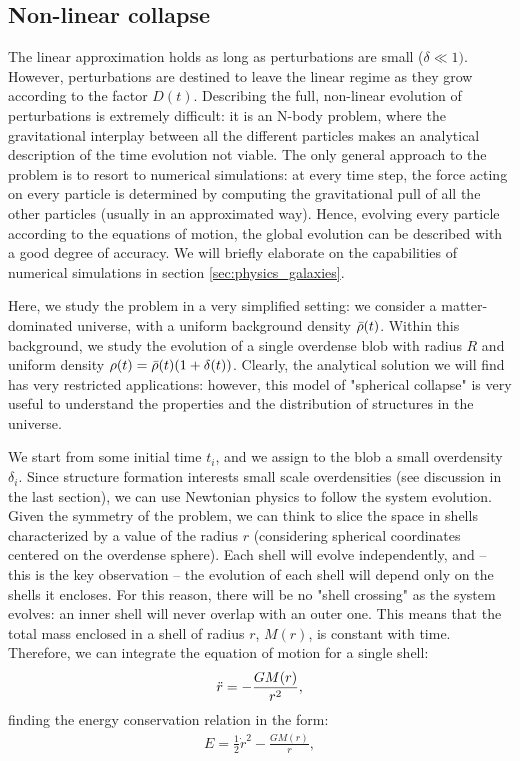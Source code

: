  
 \subsection{Non-linear collapse} \label{sec:nonlinear_collapse}
 
 The linear approximation holds as long as perturbations are small ($\delta\ll1)$. However, perturbations are destined to leave the linear regime as they grow according to the factor $D(t)$. Describing the full, non-linear evolution of perturbations is extremely difficult: it is an N-body problem, where the gravitational interplay between all the different particles makes an analytical description of the time evolution not viable. The only general approach to the problem is to resort to numerical simulations: at every time step, the force acting on every particle is determined by computing the gravitational pull of all the other particles (usually in an approximated way). Hence, evolving every particle according to the equations of motion, the global evolution can be described with a good degree of accuracy. We will briefly elaborate on the capabilities of numerical simulations in section \ref{sec:physics_galaxies}.
 
 Here, we study the problem in a very simplified setting: we consider a matter-dominated universe, with a uniform background density $\Bar{\rho}(t)$. Within this background, we study the evolution of a single overdense blob with radius $R$ and uniform density $\rho (t) = \Bar{\rho}(t)(1+\delta(t))$. Clearly, the analytical solution we will find has very restricted applications: however, this model of "spherical collapse" is very useful to understand the properties and the distribution of structures in the universe.
 
 We start from some initial time $t_i$, and we assign to the blob a small overdensity $\delta_i$. Since structure formation interests small scale overdensities (see discussion in the last section), we can use Newtonian physics to follow the system evolution. Given the symmetry of the problem, we can think to slice the space in shells characterized by a value of the radius $r$ (considering spherical coordinates centered on the overdense sphere). Each shell will evolve independently, and -- this is the key observation -- the evolution of each shell will depend only on the shells it encloses. For this reason, there will be no "shell crossing" as the system evolves: an inner shell will never overlap with an outer one. This means that the total mass enclosed in a shell of radius $r$, $M(r)$, is constant with time. Therefore, we can integrate the equation of motion for a single shell:
 \begin{align}
   \Ddot{r} = -\frac{GM(r)}{r^2},
 \end{align}
 finding the energy conservation relation in the form:
  \begin{align}
   E = \frac{1}{2}\Dot{r}^2 - \frac{GM(r)}{r},  \label{eq:energy_collapse}
  \end{align}
  
